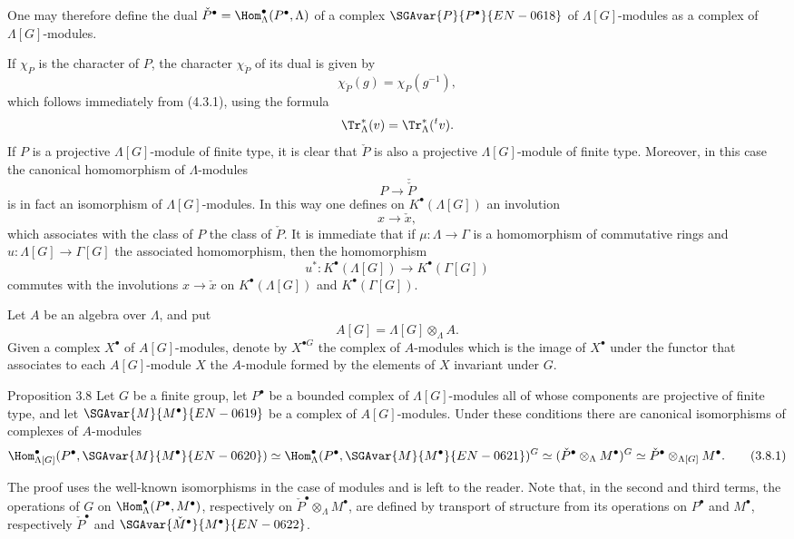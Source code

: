 One may therefore define the dual $\check P^\bullet=\Hom_\Lambda^\bullet(P^\bullet,\Lambda)$ of a complex $\SGAvar{P}{P^\bullet}{EN-0618}$ of $\Lambda[G]$-modules as a complex of $\Lambda[G]$-modules.

If $\chi_P$ is the character of $P$, the character $\chi_{\check P}$ of its dual is given by
\[
\chi_{\check P}(g)=\chi_P(g^{-1}),
\tag{3.7.2}
\]
which follows immediately from (4.3.1), using the formula
\[
\Tr_\Lambda^*(v)=\Tr_\Lambda^*({}^{t}v).
\]
If $P$ is a projective $\Lambda[G]$-module of finite type, it is clear that $\check P$ is also a projective $\Lambda[G]$-module of finite type. Moreover, in this case the canonical homomorphism of $\Lambda$-modules
\[
P\longrightarrow\check{\check P}
\]
is in fact an isomorphism of $\Lambda[G]$-modules. In this way one defines on $K^{\bullet}(\Lambda[G])$ an involution
\[
x\longrightarrow \check x,
\]
which associates with the class of $P$ the class of $\check P$. It is immediate that if $\mu:\Lambda\to\Gamma$ is a homomorphism of commutative rings and $u:\Lambda[G]\to\Gamma[G]$ the associated homomorphism, then the homomorphism
\[
u^*:K^{\bullet}(\Lambda[G])\longrightarrow K^{\bullet}(\Gamma[G])
\]
commutes with the involutions $x\longrightarrow\check x$ on $K^{\bullet}(\Lambda[G])$ and $K^{\bullet}(\Gamma[G])$.

Let $A$ be an algebra over $\Lambda$, and put
\[
A[G]=\Lambda[G]\otimes_\Lambda A.
\]
Given a complex $X^\bullet$ of $A[G]$-modules, denote by $X^{\bullet G}$ the complex of $A$-modules which is the image of $X^\bullet$ under the functor that associates to each $A[G]$-module $X$ the $A$-module formed by the elements of $X$ invariant under $G$.

\begin{statement}{Proposition 3.8}
Let $G$ be a finite group, let $P^\bullet$ be a bounded complex of $\Lambda[G]$-modules all of whose components are projective of finite type, and let $\SGAvar{M}{M^\bullet}{EN-0619}$ be a complex of $A[G]$-modules. Under these conditions there are canonical isomorphisms of complexes of $A$-modules
\[
\Hom_{\Lambda[G]}^\bullet(P^\bullet,\SGAvar{M}{M^\bullet}{EN-0620})
\simeq \Hom_\Lambda^\bullet(P^\bullet,\SGAvar{M}{M^\bullet}{EN-0621})^G
\simeq (\check P^\bullet\otimes_\Lambda M^\bullet)^G
\simeq \check P^\bullet\otimes_{\Lambda[G]}M^\bullet.
\tag{3.8.1}
\]
\end{statement}

The proof uses the well-known isomorphisms in the case of modules and is left to the reader. Note that, in the second and third terms, the operations of $G$ on $\Hom_\Lambda^\bullet(P^\bullet,M^\bullet)$, respectively on $\check P^\bullet\otimes_\Lambda M^\bullet$, are defined by transport of structure from its operations on $P^\bullet$ and $M^\bullet$, respectively $\check P^\bullet$ and $\SGAvar{\check{M}^\bullet}{M^\bullet}{EN-0622}$.

